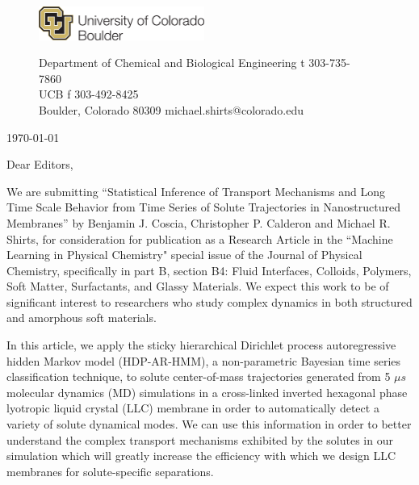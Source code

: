 \documentclass[fontsize=11pt]{article}
\begin{document}
	\graphicspath{{./figures/}}

	\begin{figure}
	\centering
	\begin{minipage}{0.37\textwidth}
	\includegraphics[width=2.14in,left]{CUBoulder.pdf}
	\end{minipage}
	\begin{minipage}{0.62\textwidth}
	\scriptsize
	\noindent Department of Chemical and Biological Engineering \hfill t 303-735-7860~~~~~~~~~~~~~~~~~~ \\
	 UCB \hfill f 303-492-8425~~~~~~~~~~~~~~~~~~ \\
	\noindent Boulder, Colorado 80309 \hfill michael.shirts@colorado.edu \\
	\end{minipage}
	\end{figure}
	
	\noindent \today

	\noindent Dear Editors,\\
	
	\newcommand{\ManuscriptTitle}{Statistical Inference of Transport Mechanisms and
	Long Time Scale Behavior from Time Series of Solute Trajectories in 
	Nanostructured Membranes}
	
	We are submitting ``\ManuscriptTitle'' by Benjamin J. Coscia, Christopher P.
	Calderon and Michael R. Shirts, for	consideration for publication as a Research
	Article in the ``Machine Learning in Physical Chemistry" special issue of the Journal 
	of Physical Chemistry, specifically in part B, section B4: Fluid 
	Interfaces, Colloids, Polymers, Soft Matter, Surfactants, and Glassy Materials.
	We expect this work to be of significant interest to researchers who study complex 
	dynamics in both structured and amorphous soft materials.
	
	In this article, we apply the sticky hierarchical Dirichlet process autoregressive
	hidden Markov model (HDP-AR-HMM), a non-parametric Bayesian time series
	classification technique, to solute center-of-mass trajectories generated from
	5 $\mu s$ molecular dynamics (MD) simulations in a cross-linked inverted hexagonal
	phase lyotropic liquid crystal (LLC) membrane in order to automatically detect a
	variety of solute dynamical modes. We can use this information in order to 
	better understand the complex transport mechanisms exhibited by the solutes in 
	our simulation which will greatly increase the efficiency with which we 
	design LLC membranes for solute-specific separations.
	
\end{document}
